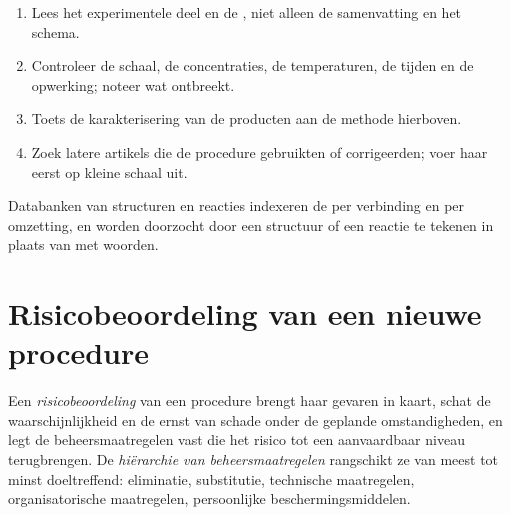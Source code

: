 \begin{method}\label{met:b3:lab-techniques-3:read-paper}
\begin{enumerate}
  \item Lees het experimentele deel en de , niet
        alleen de samenvatting en het schema.
  \item Controleer de schaal, de concentraties, de temperaturen, de tijden
        en de opwerking; noteer wat ontbreekt.
  \item Toets de karakterisering van de producten aan de methode
        hierboven.
  \item Zoek latere artikels die de procedure gebruikten of corrigeerden;
        voer haar eerst op kleine schaal uit.
\end{enumerate}
\end{method}

Databanken van structuren en reacties indexeren de 
per verbinding en per omzetting, en worden doorzocht door een structuur
of een reactie te tekenen in plaats van met woorden.

\section{Risicobeoordeling van een nieuwe procedure}

\begin{definition}[Risicobeoordeling]\label{def:b3:lab-techniques-3:assessment}
Een \emph{risicobeoordeling} van een procedure
brengt haar gevaren in kaart, schat de waarschijnlijkheid en de ernst van
schade onder de geplande omstandigheden, en legt de beheersmaatregelen
vast die het risico tot een aanvaardbaar niveau terugbrengen. De
\emph{hiërarchie van beheersmaatregelen}
rangschikt ze van meest tot minst doeltreffend: eliminatie, substitutie,
technische maatregelen, organisatorische maatregelen, persoonlijke
beschermingsmiddelen.
\end{definition}

